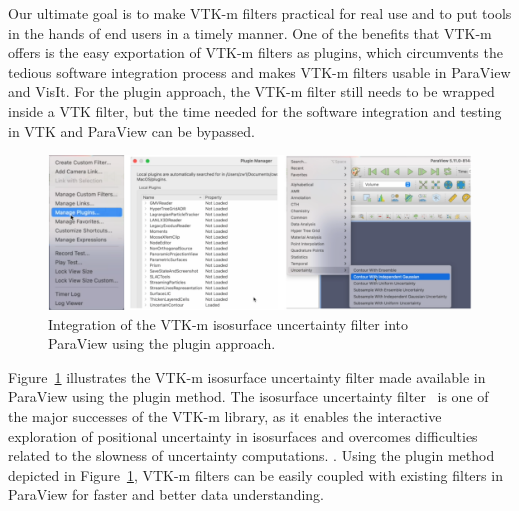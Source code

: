 Our ultimate goal is to make VTK-m filters practical for real use and to put tools in the hands of end users in a timely manner. One of the benefits that VTK-m offers is the easy exportation of VTK-m filters as plugins, which circumvents the tedious software integration process and makes VTK-m filters usable in ParaView and VisIt. For the plugin approach, the VTK-m filter still needs to be wrapped inside a VTK filter, but the time needed for the software integration and testing in VTK and ParaView can be bypassed.       

\begin{figure}[htb]
  \includegraphics[width=\linewidth]{figures/isosurfaceUncertaintyPlugin.png}
  \caption{Integration of the VTK-m isosurface uncertainty filter into ParaView using the plugin approach.}
  \label{fig:uncertainty-plugin}
\end{figure}

Figure~\ref{fig:uncertainty-plugin} illustrates the VTK-m isosurface uncertainty filter made available in ParaView using the plugin method. The isosurface uncertainty filter~\cite{wang2023funmc} is one of the major successes of the VTK-m library, as it enables the interactive exploration of positional uncertainty in isosurfaces and overcomes difficulties related to the slowness of uncertainty computations. . Using the plugin method depicted in Figure~\ref{fig:uncertainty-plugin}, VTK-m filters can be easily coupled with existing filters in ParaView for faster and better data understanding.

